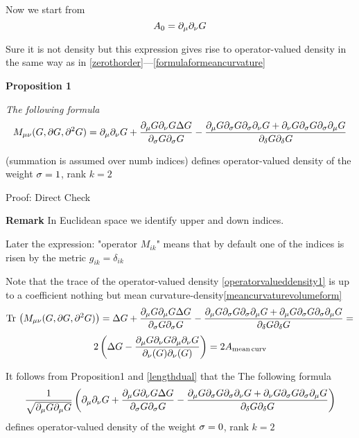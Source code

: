 \documentclass[12pt]{article}
\theoremstyle{theorem}
\begin{document}
Now we start from
\begin{equation}\label{zerothorderoperatordensity}
    A_0=\partial_\mu\partial_\nu G
\end{equation}


Sure it is not density but this expression gives rise to operator-valued density
in the same way as in  \eqref{zerothorder}---\eqref{formulaformeancurvature}


 {\bf Proposition 1}
 {\it The following formula
 \begin{equation}\label{operatorvalueddensity1}
    M_{\mu\nu}(G,\partial G, \partial^2G)=
   \partial_\mu\partial_\nu G+{\partial_\mu G\partial_\nu G\Delta G\over \partial_{\sigma} G\partial_{\sigma} G}
  -{\partial_\mu G\partial_{\sigma} G\partial_{\sigma}\partial_\nu G+\partial_\nu G\partial_{\sigma} G\partial_{\sigma}\partial_\mu G
  \over \partial_\delta G\partial_\delta G}
\end{equation}

(summation is assumed over numb indices)
 defines operator-valued density of the weight ${\sigma}=1$, rank $k=2$}

\medskip





 Proof: Direct Check

\bigskip

{\bf Remark} In Euclidean space we identify upper and down indices.

Later the expression: "operator $M_{ik}$" means that by default one of the indices
is risen by the metric $g_{ik}=\delta_{ik}$


\smallskip


Note that the trace of the operator-valued density  \eqref{operatorvalueddensity1}
is up to a coefficient
nothing but mean curvature-density\eqref{meancurvaturevolumeform}
                 $$
    {\rm Tr\,} \left(M_{\mu\nu}(G,\partial G, \partial^2G)\right)=
   \Delta G+{\partial_\mu G\partial_\mu G\Delta G\over \partial_{\sigma} G\partial_{\sigma} G}
  -{\partial_\mu G\partial_{\sigma} G\partial_{\sigma}\partial_\mu G+\partial_\mu G\partial_{\sigma} G\partial_{\sigma}\partial_\mu G
  \over \partial_\delta G\partial_\delta G}=
            $$
  \begin{equation}\label{traceofoperatorvalueddensity}
2\left(\Delta G-{\partial_\mu G\partial_\nu G \partial_\mu\partial_\nu G\over \partial_\nu (G)\partial_\nu (G)}\right)=
2 A_{\rm mean\,curv}
\end{equation}


It follows from Proposition1 and \eqref{lengthdual} that the
The following formula
\begin{equation}\label{operatorvalueddensity1}
                 {1\over \sqrt {\partial_\mu G\partial_\mu G}} \left(
   \partial_\mu\partial_\nu G+{\partial_\mu G\partial_\nu G\Delta G\over \partial_{\sigma} G\partial_{\sigma} G}
  -{\partial_\mu G\partial_{\sigma} G\partial_{\sigma}\partial_\nu G+\partial_\nu G\partial_{\sigma} G\partial_{\sigma}\partial_\mu G
  \over \partial_\delta G\partial_\delta G}\right)
\end{equation}
defines operator-valued density of the weight ${\sigma}=0$, rank $k=2$
\end{document}
